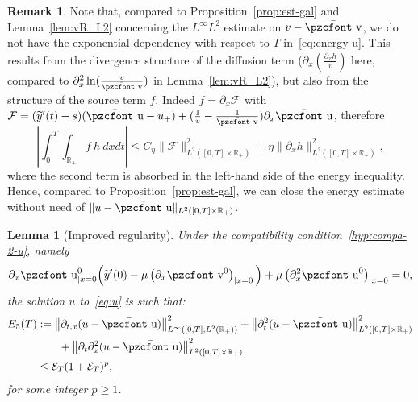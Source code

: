 \documentclass[10pt]{amsart}
\newtheorem{lemm}[theo]{Lemma}\newtheorem{prop}[theo]{Proposition}\newtheorem{coro}[theo]{Corollary}\newtheorem{conj}[theo]{Conjecture}
\theoremstyle{definition}\newtheorem{defi}[theo]{Definition}\newtheorem{rema}[theo]{Remark}\newtheorem{exam}[theo]{Example}\newtheorem{exem}[theo]{Example}\newtheorem{nota}[theo]{Notation}
\newcommand{\mathpzc}[1]{\text{\pzcfont #1}}
\newcommand{\R}{\mathbb{R}}
\newcommand{\p}{\partial}
\newcommand{\bv}{\bar{\mathpzc{v}}}
\newcommand{\bu}{\bar{\mathpzc{u}}}
\newcommand{\cE}{\mathcal E}
\newcommand{\cF}{\mathcal F}
\newcommand{\tv}{\mathpzc{v}}
\newcommand{\tu}{\mathpzc{u}}
\newcommand{\ty}{\widetilde{y}}
\begin{document}
\begin{rema}
Note that, compared to Proposition~\ref{prop:est-gal} and Lemma~\ref{lem:vR_L2} concerning the $L^\infty L^2$ estimate on $v-\bv$, we do not have the exponential dependency with respect to $T$ in~\eqref{eq:energy-u}. This results from the divergence structure of the diffusion term ($\partial_x (\frac{\partial_xh}{v})$ here, compared to $\partial^2_x \ln (\frac{v}{\bv})$ in Lemma~\ref{lem:vR_L2}), but also from the structure of the source term $f$. Indeed $f= \partial_x \cF$ with $\cF = (\ty'(t)-s)(\bu - u_+) + (\frac{1}{v}-\frac{1}{\bv}) \p_x \bu$, therefore
\[
\left|\int_0^T \int_{\R_+} f \ h \ dx dt \right|
\leq C_\eta \|\cF\|_{L^2([0,T]\times \R_+)}^2 + \eta \|\partial_xh\|_{L^2\left([0,T]\times \R_+\right)}^2,
\]
where the second term is absorbed in the left-hand side of the energy inequality. Hence, compared to Proposition~\ref{prop:est-gal}, we can close the energy estimate without need of $\|u-\bu\|_{L^2([0,T] \times \R_+)}$.
\end{rema}

\begin{lemm}[Improved regularity]\label{lem:u-2}
Under the compatibility condition~\eqref{hyp:compa-2-u}, namely
\[
\partial_x \tu^0_{|x=0}\Big(\ty'(0) -\mu \left(\partial_x \tv^0\right)_{|x=0} \Big) + \mu \left(\partial^2_x \tu^0\right)_{|x=0} = 0,
\]
the solution $u$ to~\eqref{eq:u} is such that:
\begin{align*}
E_5(T) &:=\left\|\partial_{t,x}(u-\bu)\right\|_{L^\infty\left([0,T]; L^2(\R_+)\right)}^2 + \left\|\partial^2_t(u-\bu)\right\|_{L^2\left([0,T]\times \R_+\right)}^2 \\
&\qquad+ \left\|\partial_t \partial^2_x(u-\bu)\right\|_{L^2\left([0,T]\times \R_+\right)}^2 \nonumber \\
&\leq \cE_T(1+ \cE_T)^p,
\end{align*}
for some integer $p\geq 1$.
\end{lemm}
\end{document}
